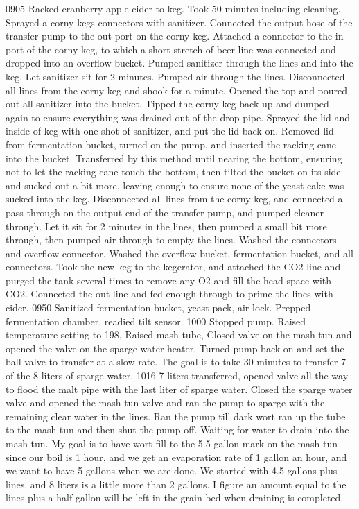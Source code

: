 0905 Racked cranberry apple cider to keg.  Took 50 minutes including cleaning.  Sprayed a corny kegs connectors with sanitizer.  Connected the output hose of the transfer pump to the out port on the corny keg.  Attached a connector to the in port of the corny keg, to which a short stretch of beer line was connected and dropped into an overflow bucket.  Pumped sanitizer through the lines and into the keg.  Let sanitizer sit for 2 minutes.  Pumped air through the lines.  Disconnected all lines from the corny keg and shook for a minute.  Opened the top and poured out all sanitizer into the bucket.  Tipped the corny keg back up and dumped again to ensure everything was drained out of the drop pipe.  Sprayed the lid and inside of keg with one shot of sanitizer, and put the lid back on.  Removed lid from fermentation bucket, turned on the pump, and inserted the racking cane into the bucket.  Transferred by this method until nearing the bottom, ensuring not to let the racking cane touch the bottom, then tilted the bucket on its side and sucked out a bit more, leaving enough to ensure none of the yeast cake was sucked into the keg.  Disconnected all lines from the corny keg, and connected a pass through on the output end of the transfer pump, and pumped cleaner through.  Let it sit for 2 minutes in the lines, then pumped a small bit more through, then pumped air through to empty the lines.  Washed the connectors and overflow connector.  Washed the overflow bucket, fermentation bucket, and all connectors.  Took the new keg to the kegerator, and attached the CO2 line and purged the tank several times to remove any O2 and fill the head space with CO2.  Connected the out line and fed enough through to prime the lines with cider.
0950 Sanitized fermentation bucket, yeast pack, air lock.  Prepped fermentation chamber, readied tilt sensor.
1000 Stopped pump.  Raised temperature setting to 198, Raised mash tube, Closed valve on the mash tun and opened the valve on the sparge water heater.  Turned pump back on and set the ball valve to transfer at a slow rate.  The goal is to take 30 minutes to transfer 7 of the 8 liters of sparge water.
1016 7 liters transferred, opened valve all the way to flood the malt pipe with the last liter of sparge water.  Closed the sparge water valve and opened the mash tun valve and ran the pump to sparge with the remaining clear water in the lines.  Ran the pump till dark wort ran up the tube to the mash tun and then shut the pump off.  Waiting for water to drain into the mash tun.  My goal is to have wort fill to the 5.5 gallon mark on the mash tun since our boil is 1 hour, and we get an evaporation rate of 1 gallon an hour, and we want to have 5 gallons when we are done.  We started with 4.5 gallons plus lines, and 8 liters is a little more than 2 gallons.  I figure an amount equal to the lines plus a half gallon will be left in the grain bed when draining is completed.
